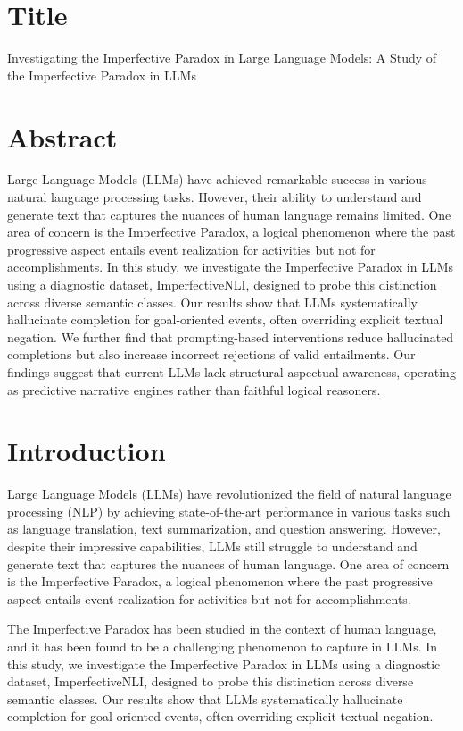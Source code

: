 \documentclass{article}
\begin{document}
\section*{Title}
    \vspace{-0.5cm}
    Investigating the Imperfective Paradox in Large Language Models: A Study of the Imperfective Paradox in LLMs

\section*{Abstract}
    \vspace{-0.5cm}
    Large Language Models (LLMs) have achieved remarkable success in various natural language processing tasks. However, their ability to understand and generate text that captures the nuances of human language remains limited. One area of concern is the Imperfective Paradox, a logical phenomenon where the past progressive aspect entails event realization for activities but not for accomplishments. In this study, we investigate the Imperfective Paradox in LLMs using a diagnostic dataset, ImperfectiveNLI, designed to probe this distinction across diverse semantic classes. Our results show that LLMs systematically hallucinate completion for goal-oriented events, often overriding explicit textual negation. We further find that prompting-based interventions reduce hallucinated completions but also increase incorrect rejections of valid entailments. Our findings suggest that current LLMs lack structural aspectual awareness, operating as predictive narrative engines rather than faithful logical reasoners.

\section*{Introduction}
    \vspace{-0.5cm}
    Large Language Models (LLMs) have revolutionized the field of natural language processing (NLP) by achieving state-of-the-art performance in various tasks such as language translation, text summarization, and question answering. However, despite their impressive capabilities, LLMs still struggle to understand and generate text that captures the nuances of human language. One area of concern is the Imperfective Paradox, a logical phenomenon where the past progressive aspect entails event realization for activities but not for accomplishments.

    The Imperfective Paradox has been studied in the context of human language, and it has been found to be a challenging phenomenon to capture in LLMs. In this study, we investigate the Imperfective Paradox in LLMs using a diagnostic dataset, ImperfectiveNLI, designed to probe this distinction across diverse semantic classes. Our results show that LLMs systematically hallucinate completion for goal-oriented events, often overriding explicit textual negation.
\end{document}
